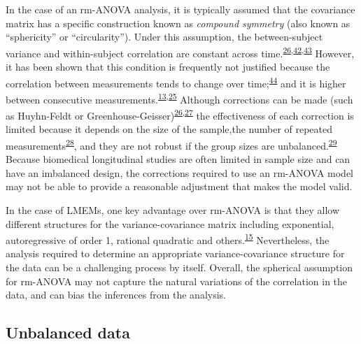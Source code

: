 \documentclass[
]{article}
\begin{document}
In the case of an rm-ANOVA analysis, it is typically assumed that the covariance matrix has a specific construction known as \emph{compound symmetry} (also known as ``sphericity'' or ``circularity''). Under this assumption, the between-subject variance and within-subject correlation are constant across time.\textsuperscript{\protect\hyperlink{ref-huynh1976}{26},\protect\hyperlink{ref-weiss2005}{42},\protect\hyperlink{ref-geisser1958}{43}} However, it has been shown that this condition is frequently not justified because the correlation between measurements tends to change over time;\textsuperscript{\protect\hyperlink{ref-maxwell2017}{44}} and it is higher between consecutive measurements.\textsuperscript{\protect\hyperlink{ref-gueorguieva2004}{13},\protect\hyperlink{ref-ugrinowitsch2004}{25}} Although corrections can be made (such as Huyhn-Feldt or Greenhouse-Geisser)\textsuperscript{\protect\hyperlink{ref-huynh1976}{26},\protect\hyperlink{ref-greenhouse1959}{27}} the effectiveness of each correction is limited because it depends on the size of the sample,the number of repeated measurements\textsuperscript{\protect\hyperlink{ref-haverkamp2017}{28}}, and they are not robust if the group sizes are unbalanced.\textsuperscript{\protect\hyperlink{ref-keselman2001}{29}} Because biomedical longitudinal studies are often limited in sample size and can have an imbalanced design, the corrections required to use an rm-ANOVA model may not be able to provide a reasonable adjustment that makes the model valid.

In the case of LMEMs, one key advantage over rm-ANOVA is that they allow different structures for the variance-covariance matrix including exponential, autoregressive of order 1, rational quadratic and others.\textsuperscript{\protect\hyperlink{ref-pinheiro2006}{15}} Nevertheless, the analysis required to determine an appropriate variance-covariance structure for the data can be a challenging process by itself. Overall, the spherical assumption for rm-ANOVA may not capture the natural variations of the correlation in the data, and can bias the inferences from the analysis.

\hypertarget{unbalanced-data}{%
\subsection{Unbalanced data}\label{unbalanced-data}}
\end{document}
